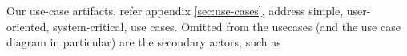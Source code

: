 Our use-case artifacts, refer appendix \ref{sec:use-cases}, address simple, user-oriented, system-critical, use cases.
Omitted from the usecases (and the use case diagram in particular) are the secondary actors, such as 